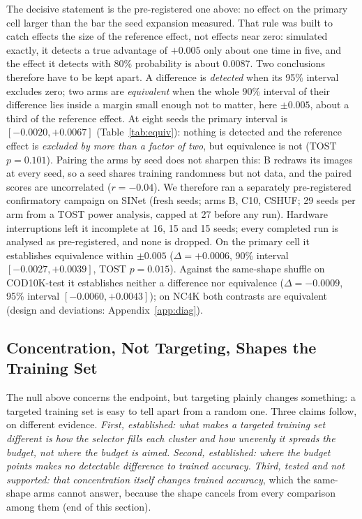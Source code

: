 \documentclass{article}
\newif\ifrevmarked \revmarkedtrue
\DeclareRobustCommand{\revB}[1]{\ifrevmarked{\color{RevB}#1}\else{#1}\fi}
\DeclareRobustCommand{\revC}[1]{\ifrevmarked{\color{RevC}#1}\else{#1}\fi}
\DeclareRobustCommand{\revShared}[1]{\ifrevmarked{\color{RevShared}#1}\else{#1}\fi}
\begin{document}
The decisive statement is the pre-registered one above: no effect on the primary cell larger than the bar the seed expansion
measured. \revShared{That rule was built to catch effects the size of the reference effect, not effects near zero: simulated
exactly, it detects a true advantage of $+0.005$ only about one time in five, and the effect it detects with 80\%
probability is about $0.0087$. Two conclusions therefore have to be kept apart. A difference is \emph{detected}
when its 95\% interval excludes zero; two arms are \emph{equivalent} when the whole 90\% interval of their difference
lies inside a margin small enough not to matter, here $\pm 0.005$, about a third of the reference effect. At eight seeds the
primary interval is $[-0.0020, +0.0067]$ (Table~\ref{tab:equiv}): nothing is detected
and the reference effect is \textit{excluded by more than a factor of two}, but equivalence is not
(TOST $p = 0.101$).} \revC{Pairing the arms by seed does not sharpen this: B redraws its images at every seed, so a seed
shares training randomness but not data, and the paired scores are uncorrelated ($r = -0.04$).}
\revShared{We therefore ran a separately pre-registered confirmatory campaign on SINet (fresh seeds; arms B, C10, CSHUF;
29 seeds per arm from a TOST power analysis, capped at 27 before any run). Hardware interruptions left it incomplete at
16, 15 and 15 seeds; every completed run is analysed as pre-registered, and none is dropped. On the primary cell it
establishes equivalence within $\pm 0.005$ ($\Delta = +0.0006$, 90\% interval $[-0.0027, +0.0039]$, TOST $p = 0.015$).
Against the same-shape shuffle on COD10K-test it establishes neither a difference nor equivalence ($\Delta = -0.0009$, 95\%
interval $[-0.0060, +0.0043]$); on NC4K both contrasts are equivalent (design and deviations: Appendix~\ref{app:diag}).}



\subsection{Concentration, Not Targeting, \texorpdfstring{\revShared{Shapes the Training Set}}{Shapes the Training Set}}
\label{sec:concentration}
\revShared{The null above concerns the endpoint, but targeting plainly changes something: a targeted training set is easy to
tell apart from a random one. Three claims follow, on different evidence.} \textit{\revShared{First, established:} \revB{what makes
a targeted training set different is how the selector fills each cluster and how unevenly it spreads the budget, not
where the budget is aimed.}} \revShared{\textit{Second, established: where the budget points makes no detectable difference to
trained accuracy.} \textit{Third, tested and not supported: that concentration itself changes trained accuracy}, which the
same-shape arms cannot answer, because the shape cancels from every comparison among them (end of this section).}
\end{document}
